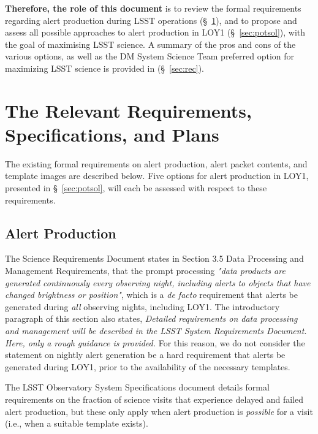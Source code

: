 \documentclass[DM,lsstdraft,toc]{lsstdoc}
\begin{document}
{\bf Therefore, the role of this document} is to review the formal requirements regarding alert production during LSST operations (\S~\ref{sec:req}), and to propose and assess all possible approaches to alert production in LOY1 (\S~\ref{sec:potsol}), with the goal of maximising LSST science. A summary of the pros and cons of the various options, as well as the DM System Science Team preferred option for maximizing LSST science is provided in (\S~\ref{sec:rec}).

\clearpage
\section{The Relevant Requirements, Specifications, and Plans}\label{sec:req}

The existing formal requirements on alert production, alert packet contents, and template images are described below.
Five options for alert production in LOY1, presented in \S~\ref{sec:potsol}, will each be assessed with respect to these requirements.

\subsection{Alert Production}\label{ssec:req_ap}

The Science Requirements Document  states in Section 3.5 Data Processing and Management Requirements, that the prompt processing {\it "data products are generated continuously every observing night, including alerts to objects that have changed brightness or position"}, which is a {\it de facto} requirement that alerts be generated during {\it all} observing nights, including LOY1. 
The introductory paragraph of this section also states,  {\it Detailed requirements on data processing and management will be described in the LSST System Requirements Document. Here, only a rough guidance is provided.} For this reason, we do not consider the  statement on nightly alert generation be a hard requirement that alerts be generated during LOY1, prior to the availability of the necessary templates. 

The LSST Observatory System Specifications document  details formal requirements on the fraction of science visits that experience delayed and failed alert production, but these only apply when alert production is {\em possible} for a visit (i.e., when a suitable template exists).
\end{document}
